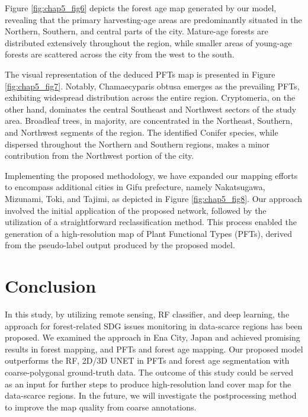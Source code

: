 Figure \ref{fig:chap5_fig6} depicts the forest age map generated by our model, revealing that the primary harvesting-age areas are predominantly situated in the Northern, Southern, and central parts of the city. Mature-age forests are distributed extensively throughout the region, while smaller areas of young-age forests are scattered across the city from the west to the south. \par

The visual representation of the deduced PFTs map is presented in Figure \ref{fig:chap5_fig7}. Notably, Chamaecyparis obtusa emerges as the prevailing PFTs, exhibiting widespread distribution across the entire region. Cryptomeria, on the other hand, dominates the central Southeast and Northwest sectors of the study area. Broadleaf trees, in majority, are concentrated in the Northeast, Southern, and Northwest segments of the region. The identified Conifer species, while dispersed throughout the Northern and Southern regions, makes a minor contribution from the Northwest portion of the city. \par

Implementing the proposed methodology, we have expanded our mapping efforts to encompass additional cities in Gifu prefecture, namely Nakatsugawa, Mizunami, Toki, and Tajimi, as depicted in Figure \ref{fig:chap5_fig8}. Our approach involved the initial application of the proposed network, followed by the utilization of a straightforward reclassification method. This process enabled the generation of a high-resolution map of Plant Functional Types (PFTs), derived from the pseudo-label output produced by the proposed model.\par

\section{Conclusion} \label{chap5_conclusion}
In this study, by utilizing remote sensing, RF classifier, and deep learning, the approach for forest-related SDG issues monitoring in data-scarce regions has been proposed. We examined the approach in Ena City, Japan and achieved promising results in forest mapping, and PFTs and forest age mapping. Our proposed model outperforms the RF, 2D/3D UNET in PFTs and forest age segmentation with coarse-polygonal ground-truth data. The outcome of this study could be served as an input for further steps to produce high-resolution land cover map for the data-scarce regions. In the future, we will investigate the postprocessing method to improve the map quality from coarse annotations.